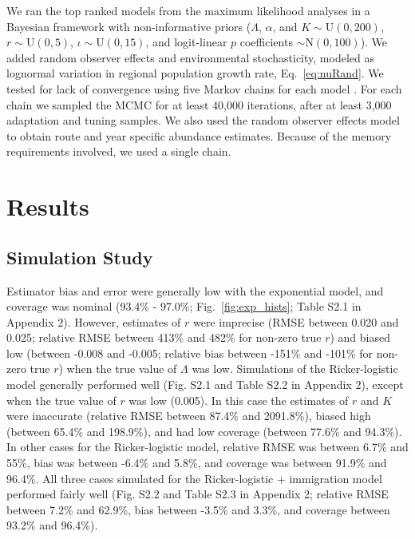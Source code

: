 \documentclass[12pt,english]{article}
\begin{document}
\begin{spacing}{1.9}
\begin{flushleft}
We ran the top ranked models from the maximum likelihood
analyses in a Bayesian framework with non-informative priors ($\Lambda$,
$\alpha$, and $K  \sim \mathrm{U}(0, 200)$, $r  \sim \mathrm{U}(0, 5)$,
$\iota  \sim \mathrm{U}(0, 15)$, and logit-linear $p$ coefficients $\sim \mathrm{N}(0, 100)$).  
We added random observer 
effects and environmental stochasticity, modeled as lognormal
variation in regional population growth rate, Eq.~\ref{eq:nuRand}. %
We tested for lack of convergence using
five Markov chains for each model \citep{gelman_rubin:1992}.
For each chain we sampled the MCMC for at least 40,000 iterations, after at
least 3,000 adaptation and tuning samples.  
We also used the random observer effects model to obtain route and 
year specific abundance estimates.  Because of the memory requirements involved,
we used %
a single chain.  %

\section*{Results}

\subsection*{Simulation Study}

Estimator bias and error were generally low with the exponential model, and 
coverage was nominal (93.4\% - 97.0\%; Fig.~\ref{fig:exp_hists}; Table S2.1 in Appendix 2). 
However, estimates of $r$ were 
imprecise (RMSE between 0.020 and 0.025; relative RMSE between 413\% and 
482\% for non-zero true $r$) and biased low (between -0.008 and -0.005; relative bias between
-151\% and -101\% for non-zero true $r$) when the true value of
$\Lambda$ was low. %
Simulations of the Ricker-logistic model %
generally performed well (Fig. S2.1 and Table S2.2 in Appendix 2), except when the true value of $r$ was low (0.005). In this case the 
estimates of $r$ and $K$ were inaccurate (relative RMSE between 87.4\% and 2091.8\%),
biased high (between 65.4\% and 198.9\%), and had low coverage (between 77.6\% and 94.3\%).
In other cases for the Ricker-logistic model, relative RMSE was between 6.7\%
and 55\%, bias was between -6.4\% and 5.8\%, and coverage was between
91.9\% and 96.4\%.  All three cases simulated for the Ricker-logistic + immigration model 
performed fairly well (Fig. S2.2 and Table S2.3 in Appendix 2; relative RMSE between 7.2\% 
and 62.9\%, bias between -3.5\% and 3.3\%, and coverage between
93.2\% and 96.4\%).
  

\end{flushleft}
\end{spacing}
\end{document}
